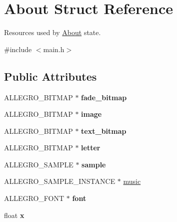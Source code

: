 \hypertarget{structAbout}{\section{\-About \-Struct \-Reference}
\label{structAbout}
}


\-Resources used by \hyperlink{structAbout}{\-About} state.  




{\ttfamily \#include $<$main.\-h$>$}

\subsection*{\-Public \-Attributes}
\begin{DoxyCompactItemize}
\item 
\hypertarget{structAbout_a0c80b08e1d60093504bed342b41e51c1}{\-A\-L\-L\-E\-G\-R\-O\-\_\-\-B\-I\-T\-M\-A\-P $\ast$ {\bfseries fade\-\_\-bitmap}}\label{structAbout_a0c80b08e1d60093504bed342b41e51c1}

\item 
\hypertarget{structAbout_a9e724aa84d322d2bfff5c00109492a1d}{\-A\-L\-L\-E\-G\-R\-O\-\_\-\-B\-I\-T\-M\-A\-P $\ast$ {\bfseries image}}\label{structAbout_a9e724aa84d322d2bfff5c00109492a1d}

\item 
\hypertarget{structAbout_a2e5dbd59393791949fd988de7b770f86}{\-A\-L\-L\-E\-G\-R\-O\-\_\-\-B\-I\-T\-M\-A\-P $\ast$ {\bfseries text\-\_\-bitmap}}\label{structAbout_a2e5dbd59393791949fd988de7b770f86}

\item 
\hypertarget{structAbout_aa46380e60629ac39d782e18dc6a08f8e}{\-A\-L\-L\-E\-G\-R\-O\-\_\-\-B\-I\-T\-M\-A\-P $\ast$ {\bfseries letter}}\label{structAbout_aa46380e60629ac39d782e18dc6a08f8e}

\item 
\hypertarget{structAbout_aaae3fb8b349d9973fde2156e1f86c75b}{\-A\-L\-L\-E\-G\-R\-O\-\_\-\-S\-A\-M\-P\-L\-E $\ast$ {\bfseries sample}}\label{structAbout_aaae3fb8b349d9973fde2156e1f86c75b}

\item 
\-A\-L\-L\-E\-G\-R\-O\-\_\-\-S\-A\-M\-P\-L\-E\-\_\-\-I\-N\-S\-T\-A\-N\-C\-E $\ast$ \hyperlink{structAbout_a4c25f6cd85f909dca5325b8825eed16c}{music}
\item 
\hypertarget{structAbout_ad14358b4942c0260e502a65b98732f93}{\-A\-L\-L\-E\-G\-R\-O\-\_\-\-F\-O\-N\-T $\ast$ {\bfseries font}}\label{structAbout_ad14358b4942c0260e502a65b98732f93}

\item 
\hypertarget{structAbout_a8ff1ed42ee1abd6ad45def77614015ce}{float {\bfseries x}}\label{structAbout_a8ff1ed42ee1abd6ad45def77614015ce}

\end{DoxyCompactItemize}


